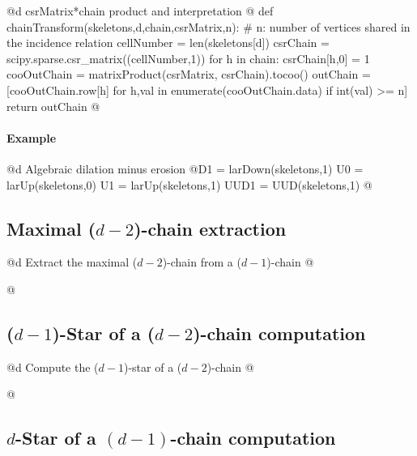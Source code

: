 \documentclass[11pt,oneside]{article}	%
\begin{document}
@d csrMatrix*chain product and interpretation
@{
def chainTransform(skeletons,d,chain,csrMatrix,n):
	# n: number of vertices shared in the incidence relation
	cellNumber = len(skeletons[d])
	csrChain = scipy.sparse.csr_matrix((cellNumber,1))
	for h in chain: csrChain[h,0] = 1
	cooOutChain = matrixProduct(csrMatrix, csrChain).tocoo()
	outChain = [cooOutChain.row[h]
		for h,val in enumerate(cooOutChain.data) if int(val) >= n]
	return outChain 
@}


\paragraph{Example}

@d Algebraic dilation minus erosion
@{D1 = larDown(skeletons,1)
U0 = larUp(skeletons,0)
U1 = larUp(skeletons,1)
UUD1 = UUD(skeletons,1)
@}



\subsection{Maximal ($d-2$)-chain extraction}


@d Extract the maximal ($d-2$)-chain from a ($d-1$)-chain
@{

@}

\subsection{($d-1$)-Star of a ($d-2$)-chain computation}

@d Compute the ($d-1$)-star of a ($d-2$)-chain
@{

@}


\subsection{$d$-Star of a $(d-1)$-chain computation}
\end{document}
